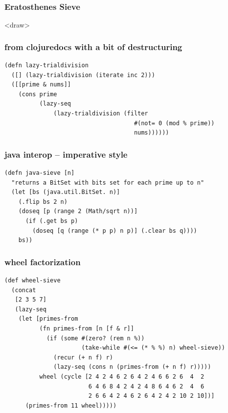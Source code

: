 \documentclass{beamer}
\begin{document}
\begin{frame}\frametitle{Eratosthenes Sieve}
<draw>
\end{frame}

\begin{frame}[fragile]
\frametitle{from clojuredocs with a bit of destructuring}
\begin{verbatim}
(defn lazy-trialdivision
  ([] (lazy-trialdivision (iterate inc 2)))
  ([[prime & nums]]
    (cons prime
          (lazy-seq
              (lazy-trialdivision (filter
                                     #(not= 0 (mod % prime))
                                     nums))))))
\end{verbatim}

\end{frame}

\begin{frame}[fragile]
\frametitle{java interop -- imperative style}
\begin{verbatim}
(defn java-sieve [n]
  "returns a BitSet with bits set for each prime up to n"
  (let [bs (java.util.BitSet. n)]
    (.flip bs 2 n)
    (doseq [p (range 2 (Math/sqrt n))]
      (if (.get bs p)
        (doseq [q (range (* p p) n p)] (.clear bs q))))
    bs))
\end{verbatim}

\end{frame}

\begin{frame}[fragile]
\frametitle{wheel factorization}
\begin{verbatim}
(def wheel-sieve
  (concat
   [2 3 5 7]
   (lazy-seq
    (let [primes-from
          (fn primes-from [n [f & r]]
            (if (some #(zero? (rem n %))
                      (take-while #(<= (* % %) n) wheel-sieve))
              (recur (+ n f) r)
              (lazy-seq (cons n (primes-from (+ n f) r)))))
          wheel (cycle [2 4 2 4 6 2 6 4 2 4 6 6 2 6  4  2
                        6 4 6 8 4 2 4 2 4 8 6 4 6 2  4  6
                        2 6 6 4 2 4 6 2 6 4 2 4 2 10 2 10])]
      (primes-from 11 wheel)))))
\end{verbatim}
\end{frame}
\end{document}
